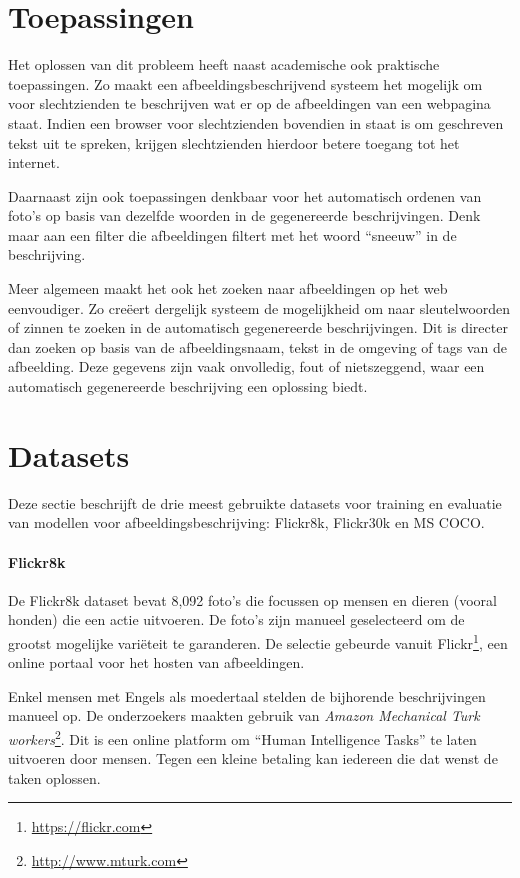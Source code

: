 \section{Toepassingen}
Het oplossen van dit probleem heeft naast academische ook praktische toepassingen. Zo maakt een afbeeldingsbeschrijvend systeem het mogelijk om voor slechtzienden te beschrijven wat er op de afbeeldingen van een webpagina staat. Indien een browser voor slechtzienden bovendien in staat is om geschreven tekst uit te spreken, krijgen slechtzienden hierdoor betere toegang tot het internet.

Daarnaast zijn ook toepassingen denkbaar voor het automatisch ordenen van foto's op basis van dezelfde woorden in de gegenereerde beschrijvingen. Denk maar aan een filter die afbeeldingen filtert met het woord ``sneeuw'' in de beschrijving. 

Meer algemeen maakt het ook het zoeken naar afbeeldingen op het web eenvoudiger. Zo cre\"eert dergelijk systeem de mogelijkheid om naar sleutelwoorden of zinnen te zoeken in de automatisch gegenereerde beschrijvingen. Dit is directer dan zoeken op basis van de afbeeldingsnaam, tekst in de omgeving of tags van de afbeelding. Deze gegevens zijn vaak onvolledig, fout of nietszeggend, waar een automatisch gegenereerde beschrijving een oplossing biedt.


\section{Datasets}
\label{sec:Datasets}
Deze sectie beschrijft de drie meest gebruikte datasets voor training en evaluatie van modellen voor afbeeldingsbeschrijving: Flickr8k, Flickr30k en MS COCO.

\paragraph{Flickr8k}
\label{par:Flickr8k}
De Flickr8k dataset\cite{Hodosh2013} bevat 8,092 foto's die focussen op mensen en dieren (vooral honden) die een actie uitvoeren. De foto's zijn manueel geselecteerd om de grootst mogelijke vari\"eteit te garanderen. De selectie gebeurde vanuit Flickr\footnote{\url{https://flickr.com}}, een online portaal voor het hosten van afbeeldingen.

Enkel mensen met Engels als moedertaal stelden de bijhorende beschrijvingen manueel op. De onderzoekers maakten gebruik van \emph{Amazon Mechanical Turk workers}\footnote{\url{http://www.mturk.com}}. Dit is een online platform om ``Human Intelligence Tasks'' te laten uitvoeren door mensen. Tegen een kleine betaling kan iedereen die dat wenst de taken oplossen. 


